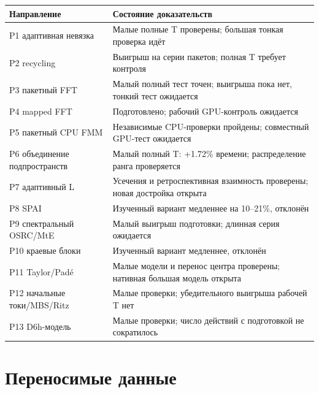 \documentclass[
  russian,
  11pt,
  a4paper,
]{report}
\newcounter{none} %
\begin{document}
{\def\LTcaptype{none} %
\begin{longtable}[]{@{}
  >{\raggedright\arraybackslash}p{}
  >{\raggedright\arraybackslash}p{}@{}}
\toprule\noalign{}
\begin{minipage}[b]{\linewidth}\raggedright
Направление
\end{minipage} & \begin{minipage}[b]{\linewidth}\raggedright
Состояние доказательств
\end{minipage} \\
\midrule\noalign{}
\endhead
\bottomrule\noalign{}
\endlastfoot
P1 адаптивная невязка & Малые полные T проверены; большая тонкая
проверка идёт \\
P2 recycling & Выигрыш на серии пакетов; полная T требует контроля \\
P3 пакетный FFT & Малый полный тест точен; выигрыша пока нет, тонкий
тест ожидается \\
P4 mapped FFT & Подготовлено; рабочий GPU-контроль ожидается \\
P5 пакетный CPU FMM & Независимые CPU-проверки пройдены; совместный
GPU-тест ожидается \\
P6 объединение подпространств & Малый полный T: +1.72\% времени;
распределение ранга проверяется \\
P7 адаптивный L & Усечения и ретроспективная взаимность проверены; новая
достройка открыта \\
P8 SPAI & Изученный вариант медленнее на 10--21\%, отклонён \\
P9 спектральный OSRC/MtE & Малый выигрыш подготовки; длинная серия
ожидается \\
P10 краевые блоки & Изученный вариант медленнее, отклонён \\
P11 Taylor/Padé & Малые модели и перенос центра проверены; нативная
большая модель открыта \\
P12 начальные токи/MBS/Ritz & Малые проверки; убедительного выигрыша
рабочей T нет \\
P13 D6h-модель & Малые проверки; число действий с подготовкой не
сократилось \\
\end{longtable}
}

\section{Переносимые
данные}\label{ux43fux435ux440ux435ux43dux43eux441ux438ux43cux44bux435-ux434ux430ux43dux43dux44bux435}
\end{document}
